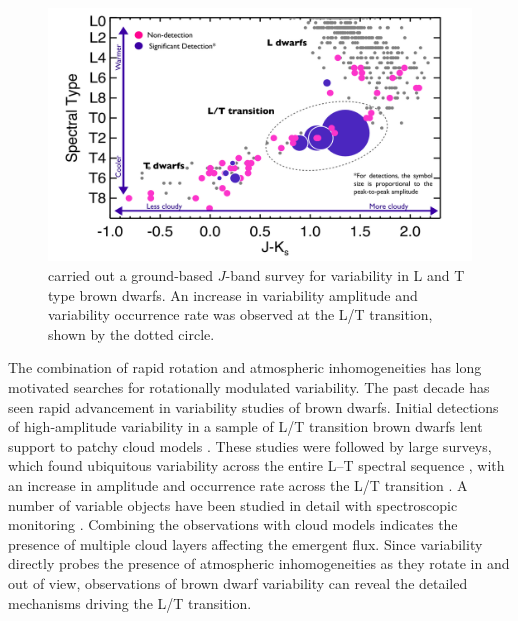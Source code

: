 \documentclass[12pt]{article}
\begin{document}
\begin{justify}
\begin{figure}[tb]
 \begin{center}
 \includegraphics[scale=0.36]{Radigan2014.png}
\end{center}
\caption{\citep{Radigan2014} carried out a ground-based $J$-band survey for variability in L and T type brown dwarfs. An increase in variability amplitude and variability occurrence rate was observed at the L/T transition, shown by the dotted circle.}
 \label{fig:Radigan2014}
\end{figure}


\noindent The combination of rapid rotation and atmospheric inhomogeneities has long motivated searches for rotationally modulated variability. The past decade has seen rapid advancement in variability studies of brown dwarfs. Initial detections of high-amplitude variability in a sample of L/T transition brown dwarfs lent support to patchy cloud models \citep{Artigau2009, Radigan2012, Gillon2013}. These studies were followed by large surveys, which found ubiquitous variability across the entire L--T spectral sequence \citep{Metchev2015a}, with an increase in amplitude and occurrence rate across the L/T transition \citep[Figure \ref{fig:Radigan2014};][]{Radigan2014}.
A number of variable objects have been studied in detail with spectroscopic monitoring \citep{Apai2013, Buenzli2015, Yang2016, Schlawin2017}. Combining the observations with cloud models indicates the presence of multiple cloud layers affecting the emergent flux. 
{Since variability directly probes the presence of atmospheric inhomogeneities as they rotate in and out of view, observations of brown dwarf variability can reveal the detailed mechanisms driving the L/T transition.}


\end{justify}
\end{document}
